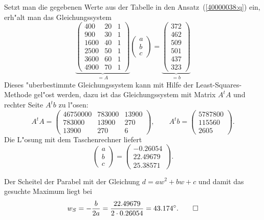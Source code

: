\begin{loesung}
\begin{teilaufgaben}
\item
Setzt man die gegebenen Werte aus der Tabelle in den Ansatz~(\ref{40000038:q})
ein, erh"alt man das Gleichungssystem
\[
\underbrace{
\begin{pmatrix}
 400&20&1\\
 900&30&1\\
1600&40&1\\
2500&50&1\\
3600&60&1\\
4900&70&1
\end{pmatrix}}_{\displaystyle = A}
\begin{pmatrix}
a\\
b\\
c
\end{pmatrix}
=
\underbrace{
\begin{pmatrix}
372\\
462\\
509\\
501\\
437\\
323
\end{pmatrix}}_{\displaystyle = b}
\]
Dieses "uberbestimmte Gleichungssystem kann mit Hilfe der
Least-Squares-Methode gel"ost werden, dazu ist das Gleichungssystem
mit Matrix $A^tA$ und rechter Seite $A^tb$ zu l"osen:
\[
A^tA
=
\begin{pmatrix}
46750000&783000&13900\\
  783000& 13900&  270\\
   13900&   270&    6
\end{pmatrix},
\qquad
A^tb
=
\begin{pmatrix}
5787800\\
 115560\\
   2605
\end{pmatrix}.
\]
Die L"osung mit dem Taschenrechner liefert
\[
\begin{pmatrix}
a\\b\\c
\end{pmatrix}
=
\begin{pmatrix}
-0.26054\\
22.49679\\
25.38571
\end{pmatrix}.
\]
\item
Der Scheitel der Parabel mit der Gleichung $d=aw^2 + bw+c$
und damit das gesuchte Maximum liegt bei
\[
w_S=-\frac{b}{2a}=\frac{22.49679}{2\cdot 0.26054}=43.174^\circ.
\qedhere
\]
\end{teilaufgaben}
\end{loesung}


